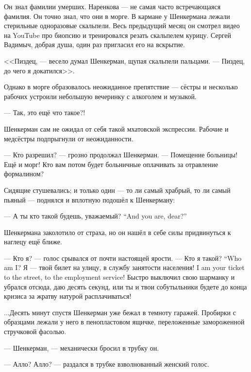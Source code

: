Он знал фамилии умерших.
Наренкова --- не самая часто встречающаяся фамилия.
Он точно знал, что они в морге.
В кармане у Шенкермана лежали стерильные одноразовые скальпели.
Весь предыдущий месяц он смотрел видео на YouTube про биопсию и тренировался резать скальпелем курицу.
Сергей Вадимыч, добрая душа, один раз пригласил его на вскрытие.

<<Пиздец, --- весело думал Шенкерман, щупая скальпели пальцами.
--- Пиздец, до чего я докатился>>.

\textspace

Однако в морге образовалось неожиданное препятствие --- сёстры и несколько рабочих устроили небольшую вечеринку с алкоголем и музыкой.

--- Так, это ещё что такое?!

Шенкерман сам не ожидал от себя такой мхатовской экспрессии.
Рабочие и медсёстры подпрыгнули от неожиданности.

--- Кто разрешил? --- грозно продолжал Шенкерман.
--- Помещение больницы!
Ещё и морг!
Кто вам потом будет больничные оплачивать за отравление формалином?

Сидящие стушевались;
и только один --- то ли самый храбрый, то ли самый пьяный --- поднялся и вплотную подошёл к Шенкерману:

{--- А ты кто такой будешь, уважаемый?}
{``And you are, dear?''}

Шенкермана заколотило от страха, но он нашёл в себе силы придвинуться к наглецу ещё ближе.

--- Кто я? --- голос срывался от почти настоящей ярости.
{--- Кто я такой?}
{``Who am I?}
{Я --- твой билет на улицу, в службу занятости населения!}
{I am your ticket to the street, to the employment service!}
Быстро выключил свою шарманку и убрался отсюда, даю десять секунд, или ты и твои собутыльники будете до конца кризиса за жратву натурой расплачиваться!

...Десять минут спустя Шенкерман уже бежал в темноту гаражей.
Пробирки с образцами лежали у него в пенопластовом ящичке, переложенные замороженной стручковой фасолью.

\asterism

\textspace

--- Шенкерман, --- механически бросил в трубку он.

--- Алло? Алло? --- раздался в трубке взволнованный женский голос.

